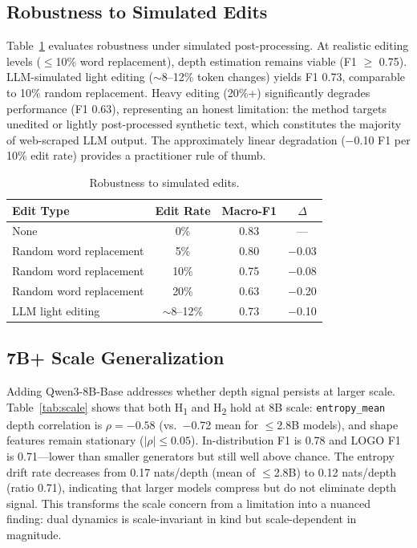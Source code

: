 \documentclass[letterpaper]{article}
\newcommand{\feat}[1]{\texttt{#1}}
\newcommand{\htwo}{H\textsubscript{2}}
\newcommand{\hone}{H\textsubscript{1}}
\begin{document}
\subsection{Robustness to Simulated Edits}

Table~\ref{tab:edits} evaluates robustness under simulated post-processing.
At realistic editing levels ($\leq$10\% word replacement), depth estimation remains viable (F1 $\geq$ 0.75).
LLM-simulated light editing (${\sim}$8--12\% token changes) yields F1 0.73, comparable to 10\% random replacement.
Heavy editing (20\%+) significantly degrades performance (F1 0.63), representing an honest limitation: the method targets unedited or lightly post-processed synthetic text, which constitutes the majority of web-scraped LLM output.
The approximately linear degradation ($-$0.10 F1 per 10\% edit rate) provides a practitioner rule of thumb.

\begin{table}[t]
\centering
\caption{Robustness to simulated edits.}
\label{tab:edits}
\begin{tabular}{lccc}
\toprule
Edit Type & Edit Rate & Macro-F1 & $\Delta$ \\
\midrule
None & 0\% & 0.83 & --- \\
Random word replacement & 5\% & 0.80 & $-$0.03 \\
Random word replacement & 10\% & 0.75 & $-$0.08 \\
Random word replacement & 20\% & 0.63 & $-$0.20 \\
LLM light editing & ${\sim}$8--12\% & 0.73 & $-$0.10 \\
\bottomrule
\end{tabular}
\end{table}

\subsection{7B+ Scale Generalization}

Adding Qwen3-8B-Base addresses whether depth signal persists at larger scale.
Table~\ref{tab:scale} shows that both \hone{} and \htwo{} hold at 8B scale: \feat{entropy\_mean} depth correlation is $\rho = -0.58$ (vs.\ $-$0.72 mean for $\leq$2.8B models), and shape features remain stationary ($|\rho| \leq 0.05$).
In-distribution F1 is 0.78 and LOGO F1 is 0.71---lower than smaller generators but still well above chance.
The entropy drift rate decreases from 0.17 nats/depth (mean of $\leq$2.8B) to 0.12 nats/depth (ratio 0.71), indicating that larger models compress but do not eliminate depth signal.
This transforms the scale concern from a limitation into a nuanced finding: dual dynamics is scale-invariant in kind but scale-dependent in magnitude.
\end{document}
